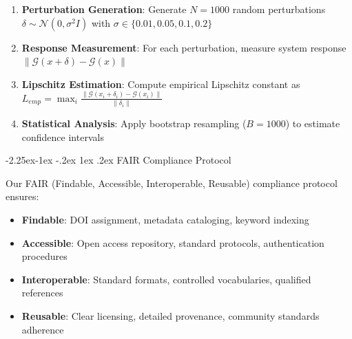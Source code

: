 \documentclass[manuscript,screen,review,anonymous,9pt]{acmart}
\makeatletter
\renewcommand\subsection{\@startsection{subsection}{2}{\z@}%
  {-2.25ex\@plus -1ex \@minus -.2ex}%
  {1ex \@plus .2ex}%
  {\normalfont\large\bfseries}}
\makeatother
\begin{document}
\begin{enumerate}
\item \textbf{Perturbation Generation}: Generate $N=1000$ random perturbations $\delta \sim \mathcal{N}(0, \sigma^2 I)$ with $\sigma \in \{0.01, 0.05, 0.1, 0.2\}$
\item \textbf{Response Measurement}: For each perturbation, measure system response $\|\mathcal{G}(x + \delta) - \mathcal{G}(x)\|$
\item \textbf{Lipschitz Estimation}: Compute empirical Lipschitz constant as $L_{emp} = \max_i \frac{\|\mathcal{G}(x_i + \delta_i) - \mathcal{G}(x_i)\|}{\|\delta_i\|}$
\item \textbf{Statistical Analysis}: Apply bootstrap resampling ($B=1000$) to estimate confidence intervals
\end{enumerate}

\subsection{FAIR Compliance Protocol}

Our FAIR (Findable, Accessible, Interoperable, Reusable) compliance protocol ensures:

\begin{itemize}
\item \textbf{Findable}: DOI assignment, metadata cataloging, keyword indexing
\item \textbf{Accessible}: Open access repository, standard protocols, authentication procedures
\item \textbf{Interoperable}: Standard formats, controlled vocabularies, qualified references
\item \textbf{Reusable}: Clear licensing, detailed provenance, community standards adherence
\end{itemize}
\end{document}
